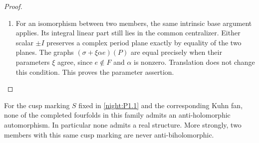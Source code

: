 \begin{proof}
\begin{enumerate}[label={$\langle1\rangle$\arabic*.}]
\item For an isomorphism between two members, the same intrinsic
base argument applies. Its integral linear part still
lies in the common centralizer. Either scalar $\pm I$
preserves a complex period plane exactly by equality
of the two planes. The graphs
$(\sigma+\xi\alpha e)(P)$ are equal precisely when their
parameters $\xi$ agree, since $e\notin F$ and $\alpha$
is nonzero. Translation does not change this condition.
This proves the parameter assertion.

\end{enumerate}
\end{proof}




\begin{theorem}\hypertarget{tag-02QQ}{}\label{night:P1.17}
For the cusp marking $S$ fixed in \cref{night:P1.1} and the corresponding Kuhn fan,
none of the completed fourfolds in this family admits an
anti-holomorphic automorphism.  In particular none admits a real
structure.  More strongly, two members with this same cusp marking
are never anti-biholomorphic.
\end{theorem}
